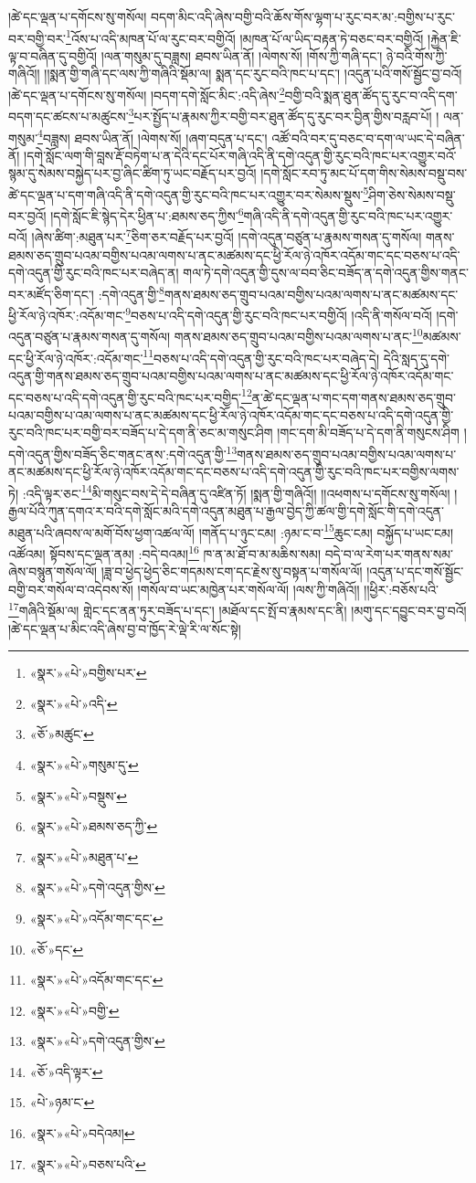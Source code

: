 །ཚེ་དང་ལྡན་པ་དགོངས་སུ་གསོལ། བདག་མིང་འདི་ཞེས་བགྱི་བའི་ཆོས་གོས་ལྷག་པ་རུང་བར་མ་:བགྱིས་པ་རུང་བར་བགྱི་བར་\footnote{«སྣར་»«པེ་»བགྱིས་པར་}འོས་པ་འདི་མཁན་པོ་ལ་རུང་བར་བགྱིའོ། །མཁན་པོ་ལ་ཡིད་བརྟན་ཏེ་བཅང་བར་བགྱིའོ། །རྐྱེན་ཇི་ལྟ་བ་བཞིན་དུ་བགྱིའོ། །ལན་གསུམ་དུ་བཟླས། ཐབས་ཡིན་ནོ། །ལེགས་སོ། །གོས་ཀྱི་གཞི་དང་། ཉེ་བའི་གོས་ཀྱི་གཞིའོ།། །།སྨན་གྱི་གཞི་དང་ལས་ཀྱི་གཞིའི་སྡོམ་ལ། སྨན་དང་རུང་བའི་ཁང་པ་དང་། །འདུན་པའི་གསོ་སྦྱོང་བྱ་བའོ། །ཚེ་དང་ལྡན་པ་དགོངས་སུ་གསོལ། །བདག་དགེ་སློང་མིང་:འདི་ཞེས་\footnote{«སྣར་»«པེ་»འདི་}བགྱི་བའི་སྨན་ཐུན་ཚོད་དུ་རུང་བ་འདི་དག་བདག་དང་ཚངས་པ་མཚུངས་\footnote{«ཅོ་»མཚུང་}པར་སྤྱོད་པ་རྣམས་ཀྱིར་བགྱི་བར་ཐུན་ཚོད་དུ་རུང་བར་བྱིན་གྱིས་བརླབ་པོ། །
ལན་གསུམ་\footnote{«སྣར་»«པེ་»གསུམ་དུ་}བཟླས། ཐབས་ཡིན་ནོ། །ལེགས་སོ། །ཞག་བདུན་པ་དང་། འཚོ་བའི་བར་དུ་བཅང་བ་དག་ལ་ཡང་དེ་བཞིན་ནོ། །དགེ་སློང་ལག་གི་བླས་རྡོ་བཏེག་པ་ན་དེའི་དང་པོར་གཞི་འདི་ནི་དགེ་འདུན་གྱི་རུང་བའི་ཁང་པར་འགྱུར་བའོ་སྙམ་དུ་སེམས་བསྐྱེད་པར་བྱ་ཞིང་ཚིག་ཏུ་ཡང་བརྗོད་པར་བྱའོ། །དགེ་སློང་རབ་ཏུ་མང་པོ་དག་གིས་སེམས་བསྡུ་བས་ཚེ་དང་ལྡན་པ་དག་གཞི་འདི་ནི་དགེ་འདུན་གྱི་རུང་བའི་ཁང་པར་འགྱུར་བར་སེམས་སྡུས་\footnote{«སྣར་»«པེ་»བསྡུས་}ཤིག་ཅེས་སེམས་བསྡུ་བར་བྱའོ། །དགེ་སློང་ཇི་སྙེད་དེར་ཕྱིན་པ་:ཐམས་ཅད་ཀྱིས་\footnote{«སྣར་»«པེ་»ཐམས་ཅད་ཀྱི་}གཞི་འདི་ནི་དགེ་འདུན་གྱི་རུང་བའི་ཁང་པར་འགྱུར་བའོ། །ཞེས་ཚིག་:མཐུན་པར་\footnote{«སྣར་»«པེ་»མཐུན་པ་}ཅིག་ཅར་བརྗོད་པར་བྱའོ། །དགེ་འདུན་བཙུན་པ་རྣམས་གསན་དུ་གསོལ། གནས་ཐམས་ཅད་གྲུབ་པའམ་བགྱིས་པའམ་ལགས་པ་ནང་མཚམས་དང་ཕྱི་རོལ་ཉེ་འཁོར་འདོམ་གང་དང་བཅས་པ་འདི་དགེ་འདུན་གྱི་རུང་བའི་ཁང་པར་བཞེད་ན། གལ་ཏེ་དགེ་འདུན་གྱི་དུས་ལ་བབ་ཅིང་བཟོད་ན་དགེ་འདུན་གྱིས་གནང་བར་མཛོད་ཅིག་དང་། :དགེ་འདུན་གྱི་\footnote{«སྣར་»«པེ་»དགེ་འདུན་གྱིས་}གནས་ཐམས་ཅད་གྲུབ་པའམ་བགྱིས་པའམ་ལགས་པ་ནང་མཚམས་དང་ཕྱི་རོལ་ཉེ་འཁོར་:འདོམ་གང་\footnote{«སྣར་»«པེ་»འདོམ་གང་དང་}བཅས་པ་འདི་དགེ་འདུན་གྱི་རུང་བའི་ཁང་པར་བགྱིའོ། །འདི་ནི་གསོལ་བའོ། །དགེ་འདུན་བཙུན་པ་རྣམས་གསན་དུ་གསོལ། གནས་ཐམས་ཅད་གྲུབ་པའམ་བགྱིས་པའམ་ལགས་པ་ནང་\footnote{«ཅོ་»དང་}མཚམས་དང་ཕྱི་རོལ་ཉེ་འཁོར་:འདོམ་གང་\footnote{«སྣར་»«པེ་»འདོམ་གང་དང་}བཅས་པ་འདི་དགེ་འདུན་གྱི་རུང་བའི་ཁང་པར་བཞེད་དེ། དེའི་སླད་དུ་དགེ་འདུན་གྱི་གནས་ཐམས་ཅད་གྲུབ་པའམ་བགྱིས་པའམ་ལགས་པ་ནང་མཚམས་དང་ཕྱི་རོལ་ཉེ་འཁོར་འདོམ་གང་དང་བཅས་པ་འདི་དགེ་འདུན་གྱི་རུང་བའི་ཁང་པར་བགྱིད་\footnote{«སྣར་»«པེ་»བགྱི་}ན་ཚེ་དང་ལྡན་པ་གང་དག་གནས་ཐམས་ཅད་གྲུབ་པའམ་བགྱིས་པ་འམ་ལགས་པ་ནང་མཚམས་དང་ཕྱི་རོལ་ཉེ་འཁོར་འདོམ་གང་དང་བཅས་པ་འདི་དགེ་འདུན་གྱི་རུང་བའི་ཁང་པར་བགྱི་བར་བཟོད་པ་དེ་དག་ནི་ཅང་མ་གསུང་ཤིག །གང་དག་མི་བཟོད་པ་དེ་དག་ནི་གསུངས་ཤིག །དགེ་འདུན་གྱིས་བཟོད་ཅིང་གནང་ནས་:དགེ་འདུན་གྱི་\footnote{«སྣར་»«པེ་»དགེ་འདུན་གྱིས་}གནས་ཐམས་ཅད་གྲུབ་པའམ་བགྱིས་པའམ་ལགས་པ་ནང་མཚམས་དང་ཕྱི་རོལ་ཉེ་འཁོར་འདོམ་གང་དང་བཅས་པ་འདི་དགེ་འདུན་གྱི་རུང་བའི་ཁང་པར་བགྱིས་ལགས་ཏེ། :འདི་ལྟར་ཅང་\footnote{«ཅོ་»འདི་ལྟར་}མི་གསུང་བས་དེ་དེ་བཞིན་དུ་འཛིན་ཏོ། །སྨན་གྱི་གཞིའོ།། །།འཕགས་པ་དགོངས་སུ་གསོལ། །རྒྱལ་པོའི་ཀུན་དགའ་ར་བའི་དགེ་སློང་མའི་དགེ་འདུན་མཐུན་པ་རྒྱལ་བྱེད་ཀྱི་ཚལ་གྱི་དགེ་སློང་གི་དགེ་འདུན་མཐུན་པའི་ཞབས་ལ་མགོ་བོས་ཕྱག་འཚལ་ལོ། །གནོད་པ་ཉུང་ངམ། :ཉམ་ང་བ་\footnote{«པེ་»ཉམ་ང་}ཆུང་ངམ། བསྐྱོད་པ་ཡང་ངམ། འཚོའམ། སྟོབས་དང་ལྡན་ནམ། :བདེ་བའམ།\footnote{«སྣར་»«པེ་»བདེའམ།} ཁ་ན་མ་ཐོ་བ་མ་མཆིས་སམ། བདེ་བ་ལ་རེག་པར་གནས་སམ་ཞེས་བསྙུན་གསོལ་ལོ། །ཟླ་བ་ཕྱེད་ཕྱེད་ཅིང་གདམས་ངག་དང་རྗེས་སུ་བསྟན་པ་གསོལ་ལོ། །འདུན་པ་དང་གསོ་སྦྱོང་བགྱི་བར་གསོལ་བ་འདེབས་སོ། །གསོལ་བ་ཡང་མཁྱེན་པར་གསོལ་ལོ། །ལས་ཀྱི་གཞིའོ།། །།ཕྱིར་:བཅོས་པའི་\footnote{«སྣར་»«པེ་»བཅས་པའི་}གཞིའི་སྡོམ་ལ། གླེང་དང་ནན་ཏུར་བཟོད་པ་དང་། །མཐོལ་དང་སྤོ་བ་རྣམས་དང་ནི། །མགུ་དང་དབྱུང་བར་བྱ་བའོ། །ཚེ་དང་ལྡན་པ་མིང་འདི་ཞེས་བྱ་བ་ཁྱོད་རེ་ལྡེ་རི་ལ་སོང་སྟེ། 